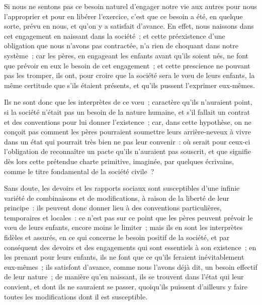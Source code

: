 \documentclass[french,twoside]{book} %
\newcommand\chaptercont{} %
\begin{document}
\chaptercont
\noindent Si nous ne sentons pas ce besoin naturel d’engager notre vie aux autres pour nous l’approprier et pour en libérer l’exercice, c’est que ce besoin a été, en quelque sorte, prévu en nous, et qu’on y a satisfait d’avance. En effet, nous naissons dans cet engagement en naissant dans la société ; et cette préexistence d’une obligation que nous n’avons pas contractée, n’a rien de choquant dans notre système ; car les pères, en engageant les enfants avant qu’ils soient nés, ne font que prévoir en eux le besoin de cet engagement ; et cette prescience ne pouvant pas les tromper, ils ont, pour croire que la société sera le vœu de leurs enfants, la même certitude que s’ils étaient présents, et qu’ils pussent l’exprimer eux-mêmes.\par
Ils ne sont donc que les interprètes de ce vœu ; caractère qu’ils n’auraient point, si la société n’était pas un besoin de la nature humaine, et s’il fallait un contrat et des conventions pour lui donner l’existence ; car, dans cette hypothèse, on ne conçoit pas comment les pères pourraient soumettre leurs arrière-neveux à vivre dans un état qui pourrait très bien ne pas leur convenir : où serait pour ceux-ci l’obligation de reconnaître un pacte qu’ils n’auraient pas souscrit, et que signifie dès lors cette prétendue charte primitive, imaginée, par quelques écrivains, comme le titre fondamental de la société civile ?\par
Sans doute, les devoirs et les rapports sociaux sont susceptibles d’une infinie variété de combinaisons et de modifications, à raison de la liberté de leur principe : ils peuvent donc donner lieu à des conventions particulières, temporaires et locales : ce n’est pas sur ce point que les pères peuvent prévoir le vœu de leurs enfants, encore moins le limiter ; mais ils en sont les interprètes fidèles et assurés, en ce qui concerne le besoin positif de la société, et par conséquent des devoirs et des engagements qui sont essentiels à son existence ; en les prenant pour leurs enfants, ils ne font que ce qu’ils feraient inévitablement eux-mêmes ; ils satisfont d’avance, comme nous l’avons déjà dit, un besoin effectif de leur nature ; de manière qu’en naissant, ils se trouvent dans l’état qui leur convient, et dont ils ne sauraient se passer, quoiqu’ils puissent d’ailleurs y faire toutes les modifications dont il est susceptible.\par
\end{document}
